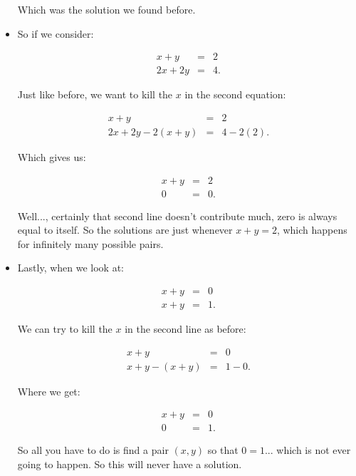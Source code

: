 \documentclass[10pt]{article}
\theoremstyle{definition}
\begin{document}
\begin{itemize}
Which was the solution we found before.


\item So if we consider:

\begin{eqnarray*}
x+y&=&2\\
2x+2y&=&4.
\end{eqnarray*}

Just like before, we want to kill the $x$ in the second equation:

\begin{eqnarray*}
x+y&=&2\\
2x+2y-2(x+y)&=&4-2(2).
\end{eqnarray*}

Which gives us:

\begin{eqnarray*}
x+y&=&2\\
0&=&0.
\end{eqnarray*}

Well..., certainly that second line doesn't contribute much, zero is always equal to itself.  So the solutions are just whenever $x+y=2$, which happens for infinitely many possible pairs.

\item Lastly, when we look at:

\begin{eqnarray*}
x+y&=&0\\
x+y&=&1.
\end{eqnarray*}

We can try to kill the $x$ in the second line as before:

\begin{eqnarray*}
x+y&=&0\\
x+y-(x+y)&=&1-0.
\end{eqnarray*}

Where we get:

\begin{eqnarray*}
x+y&=&0\\
0&=&1.
\end{eqnarray*}

So all you have to do is find a pair $(x,y)$ so that $0=1$... which is not ever going to happen.  So this will never have a solution.


\end{itemize}
\end{document}
